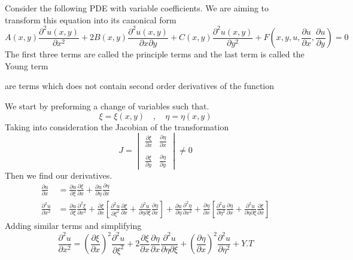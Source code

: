 \documentclass[]{article}
\begin{document}
Consider the following PDE with variable coefficients. We are aiming to transform this equation into its canonical form
\begin{equation}
A\left(x,y\right)\frac{\partial^2 u\left(x,y\right)}{\partial x^2} + 2B\left(x,y\right)\frac{\partial^2 u\left(x,y\right)}{\partial x\partial y}+C\left(x,y\right)\frac{\partial^2 u\left(x,y\right)}{\partial y^2}+F\left(x,y,u,\frac{\partial u}{\partial x},\frac{\partial u}{\partial y}\right) = 0
\end{equation}
The first three terms are called the principle terms and the last term is called the Young term
\
\begin{definition}
    are terms which does not contain second order derivatives of the function
\end{definition}
\par
We start by preforming a change of variables such that.
\[
    \xi = \xi\left(x,y\right)\quad,\quad\eta = \eta\left(x,y\right)    
\]
Taking into consideration the Jacobian of the transformation
\[
    J =\begin{vmatrix} \frac{\partial\xi}{\partial x}  & \frac{\partial\eta}{\partial x} 
        \\\\
        \frac{\partial\xi}{\partial y} & \frac{\partial\eta}{\partial y} \end{vmatrix} \neq 0    
\]
Then we find our derivatives.
\begin{align*}
\frac{\partial u}{\partial x} &= \frac{\partial u}{\partial\xi}\frac{\partial\xi}{\partial x}+\frac{\partial u}{\partial\eta}\frac{\partial\eta}{\partial x}
\\
\frac{\partial^2 u}{\partial x^2} &= \frac{\partial u}{\partial\xi}\frac{\partial^2\xi}{\partial x^2}+\frac{\partial\xi}{\partial x}\left[\frac{\partial^2 u}{\partial\xi^2}\frac{\partial\xi}{\partial x}+\frac{\partial^2 u}{\partial\eta\partial\xi}\frac{\partial\eta}{\partial x}\right]+\frac{\partial u}{\partial\eta}\frac{\partial^2\eta}{\partial x^2}+\frac{\partial\eta}{\partial x}\left[\frac{\partial^2 u}{\partial\eta^2}\frac{\partial\eta}{\partial x}+\frac{\partial^2 u}{\partial\eta\partial\xi}\frac{\partial\xi}{\partial x}\right]
\end{align*}
Adding similar terms and simplifying
\begin{equation}
\frac{\partial^2 u}{\partial x^2} = {(\frac{\partial\xi}{\partial x})}^2\frac{\partial^2 u}{\partial\xi^2}+2\frac{\partial\xi}{\partial x}\frac{\partial\eta}{\partial x}\frac{\partial^2 u}{\partial\eta\partial\xi}+{(\frac{\partial\eta}{\partial x})}^2\frac{\partial^2 u}{\partial\eta^2}+Y.T
\end{equation}
\end{document}
